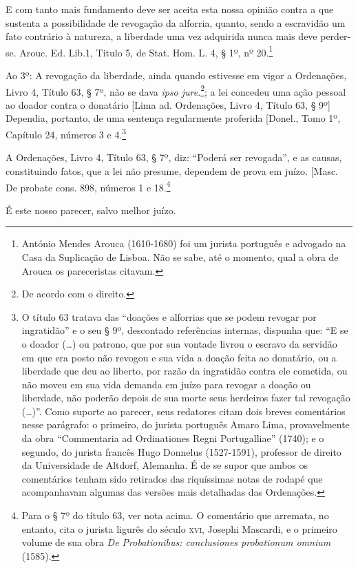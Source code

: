 E com tanto mais fundamento deve ser aceita esta nossa opinião contra a
que sustenta a possibilidade de revogação da alforria, quanto, sendo a
escravidão um fato contrário à natureza, a liberdade uma vez adquirida
nunca mais deve perder-se. Arouc. Ed. Lib.1, Titulo 5, de Stat.
Hom. L. 4, § 1º, nº 20.\footnote{António Mendes Arouca (1610-1680) foi
  um jurista português e advogado na Casa da Suplicação de Lisboa. Não
  se sabe, até o momento, qual a obra de Arouca os pareceristas citavam.}

Ao 3º: A revogação da liberdade, ainda quando estivesse em vigor a
Ordenações, Livro 4, Título 63, § 7º, não se dava
\emph{ipso jure}.\footnote{De acordo com o direito.}; a lei concedeu
uma ação pessoal ao doador contra o donatário {[}Lima ad.
Ordenações, Livro 4, Título 63, § 9º{]} Dependia,
portanto, de uma sentença regularmente proferida {[}Donel., Tomo 1º,
Capítulo 24, números 3 e 4.\footnote{O título 63 tratava
  das ``doações e alforrias que se podem revogar por ingratidão'' e o seu
  § 9º, descontado referências internas, dispunha que: ``E se o doador
  (\ldots{}) ou patrono, que por sua vontade livrou o escravo da servidão em
  que era posto não revogou e sua vida a doação feita ao donatário, ou a
  liberdade que deu ao liberto, por razão da ingratidão contra ele
  cometida, ou não moveu em sua vida demanda em juízo para revogar a
  doação ou liberdade, não poderão depois de sua morte seus herdeiros
  fazer tal revogação (\ldots{})''. Como suporte ao parecer, seus redatores
  citam dois breves comentários nesse parágrafo: o primeiro, do jurista
  português Amaro Lima, provavelmente da obra ``Commentaria ad
  Ordinationes Regni Portugalliae'' (1740); e o segundo, do jurista
  francês Hugo Donnelus (1527-1591), professor de direito da
  Universidade de Altdorf, Alemanha. É de se supor que ambos os
  comentários tenham sido retirados das riquíssimas notas de rodapé que
  acompanhavam algumas das versões mais detalhadas das Ordenações.}

A Ordenações, Livro 4, Título 63, § 7º, diz: ``Poderá
ser revogada'', e as causas, constituindo fatos, que a lei não presume,
dependem de prova em juízo. {[}Masc. De probate cons. 898, números
1 e 18.\footnote{Para o § 7º do título 63, ver nota acima. O
  comentário que arremata, no entanto, cita o jurista ligurês do século
  \textsc{xvi}, Josephi Mascardi, e o primeiro volume de sua obra \emph{De
  Probationibus: conclusiones probationum omnium} (1585).}

É este nosso parecer, salvo melhor juízo.

